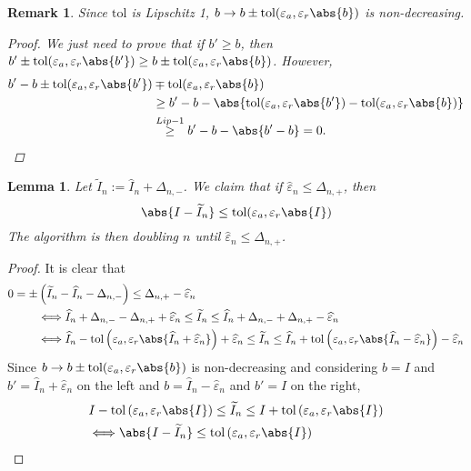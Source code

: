 \documentclass[]{elsarticle}
\newtheorem{lem}{Lemma}
\newtheorem{remark}{Remark}
\theoremstyle{definition}
\newcommand{\tol}{\text{tol}}
\begin{document}
\begin{remark}
Since $\tol$ is Lipschitz 1, $b\rightarrow b\pm \tol(\varepsilon_a,\varepsilon_r\abs{b})$ is non-decreasing.
\begin{proof}
We just need to prove that if $b'\geq b$, then $b'\pm \tol(\varepsilon_a,\varepsilon_r\abs{b'})\geq b\pm \tol(\varepsilon_a,\varepsilon_r\abs{b})$. However,
\begin{align*}
b'-b \pm \tol(\varepsilon_a,\varepsilon_r\abs{b'}) &\mp \tol(\varepsilon_a,\varepsilon_r\abs{b})\\
&\geq b'-b - \abs{ \tol(\varepsilon_a,\varepsilon_r\abs{b'}) - \tol(\varepsilon_a,\varepsilon_r\abs{b})}\\
&\stackrel{Lip-1}{\geq} b'-b - \abs{b'-b} =0.
\end{align*}
\end{proof}
\end{remark}

\begin{lem}\label{first}
Let $\widetilde{I}_n:=\widehat{I}_n+\Delta_{n,-}$. We claim that if $\widehat{\varepsilon}_n\leq \Delta_{n,+}$, then
\[
\abs{I-\widetilde{I}_n}\leq \tol(\varepsilon_a,\varepsilon_r\abs{I})
\]
The algorithm is then doubling $n$ until $\widehat{\varepsilon}_n\leq \Delta_{n,+}$.
\end{lem}
\begin{proof}
It is clear that
\begin{align*}
0=\pm&\left(\widetilde{I}_n-\widehat{I}_n-\Delta_{n,-}\right)\leq \Delta_{n,+}-\widehat{\varepsilon}_n \\
&\Longleftrightarrow \widehat{I}_n+\Delta_{n,-} - \Delta_{n,+}+\widehat{\varepsilon}_n\leq \widetilde{I}_n \leq \widehat{I}_n+\Delta_{n,-}+ \Delta_{n,+}-\widehat{\varepsilon}_n\\
&\Longleftrightarrow \widehat{I}_n-\tol\left(\varepsilon_a,\varepsilon_r\abs{\widehat{I}_n+\widehat{\varepsilon}_n}\right)+\widehat{\varepsilon}_n\leq \widetilde{I}_n \leq \widehat{I}_n+\tol\left(\varepsilon_a,\varepsilon_r\abs{\widehat{I}_n-\widehat{\varepsilon}_n}\right)-\widehat{\varepsilon}_n
\end{align*}
Since $b\rightarrow b\pm \tol(\varepsilon_a,\varepsilon_r\abs{b})$ is non-decreasing and considering $b=I$ and $b'=\widehat{I}_n+\widehat{\varepsilon}_n$ on the left and $b=\widehat{I}_n-\widehat{\varepsilon}_n$ and $b'=I$ on the right,
\begin{align*}
&I-\tol\left(\varepsilon_a,\varepsilon_r\abs{I}\right)\leq \widetilde{I}_n  \leq I+\tol\left(\varepsilon_a,\varepsilon_r\abs{I}\right)\\
&\Longleftrightarrow \abs{I-\widetilde{I}_n}\leq\tol\left(\varepsilon_a,\varepsilon_r\abs{I}\right)
\end{align*}
\end{proof}
\end{document}
